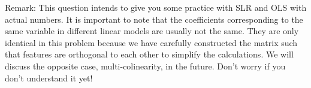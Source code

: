 \documentclass[addpoints, 12pt]{exam}
\theoremstyle{definition}
\newtheorem*{answer}{Answer}
\begin{document}
\begin{questions}


Remark: This question intends to give you some practice with SLR and OLS with actual numbers. It is important to note that the coefficients corresponding to the same variable in different linear models are usually not the same. They are only identical in this problem because we have carefully constructed the matrix such that features are orthogonal to each other to simplify the calculations. We will discuss the opposite case,  multi-colinearity, in the future. Don't worry if you don't understand it yet!


\newpage


\end{questions}
\end{document}
